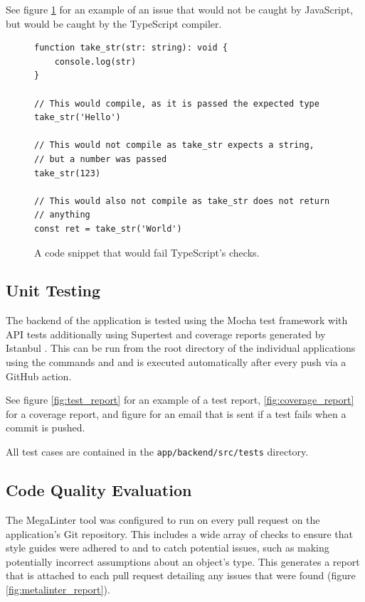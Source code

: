 See figure \ref{fig:type_check} for an example of an issue that would not be caught
by JavaScript, but would be caught by the TypeScript compiler.

\begin{figure}[h]
    \caption{\label{fig:type_check}A code snippet that would fail TypeScript's checks.}
    \begin{verbatim}
function take_str(str: string): void {
    console.log(str)
}

// This would compile, as it is passed the expected type
take_str('Hello')

// This would not compile as take_str expects a string,
// but a number was passed
take_str(123)

// This would also not compile as take_str does not return
// anything
const ret = take_str('World')
    \end{verbatim}
\end{figure}


\subsection{Unit Testing}
The backend of the application is tested using the Mocha test framework \cite{noauthor_mocha_nodate} with API tests additionally using Supertest \cite{noauthor_ladjssupertest_2024}
and coverage reports generated by Istanbul \cite{noauthor_istanbul_nodate}.
This can be run from the root directory of the individual applications  using the commands
 and  and is executed automatically after every push via a GitHub action.

See figure \ref{fig:test_report} for an example of a test report, \ref{fig:coverage_report}
for a coverage report, and figure  for an email that is sent if a test fails when a commit
is pushed.

All test cases are contained in the \texttt{app/backend/src/tests} directory.


\subsection{Code Quality Evaluation}
The MegaLinter tool \cite{vuillamy_megalinter_nodate} was configured to run on every pull request on the application's Git repository. This includes a wide array
of checks to ensure that style guides were adhered to and to catch potential issues, such as making potentially incorrect
assumptions about an object's type. This generates a report that is attached to each pull request detailing
any issues that were found (figure \ref{fig:metalinter_report}).

